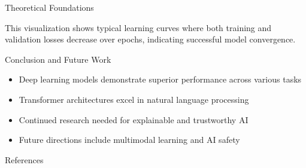 \documentclass{ctexbeamer}
\newlength{\colwidth}
\begin{document}
\begin{frame}[t]
\begin{columns}[t]
\begin{column}{\colwidth}
\begin{exampleblock}{Theoretical Foundations}
    \begin{center}
    \end{center}
    This visualization shows typical learning curves where both training and validation losses decrease over epochs, indicating successful model convergence.
\end{exampleblock}

\begin{exampleblock}{Conclusion and Future Work}
\begin{itemize}
  \item Deep learning models demonstrate superior performance across various tasks
  \item Transformer architectures excel in natural language processing
  \item Continued research needed for explainable and trustworthy AI
  \item Future directions include multimodal learning and AI safety
\end{itemize}
\end{exampleblock}

\begin{block}{References}
\small
\footnotesize{}
\end{block}
\end{column}

\end{columns}
\end{frame}
\end{document}
